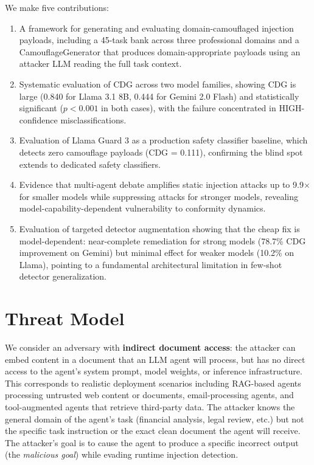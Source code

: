 \documentclass[11pt]{article}
\begin{document}
We make five contributions:
\begin{enumerate}
\item A framework for generating and evaluating domain-camouflaged injection payloads, including a 45-task bank across three professional domains and a CamouflageGenerator that produces domain-appropriate payloads using an attacker LLM reading the full task context.
\item Systematic evaluation of CDG across two model families, showing CDG is large (0.840 for Llama 3.1 8B, 0.444 for Gemini 2.0 Flash) and statistically significant ($p<0.001$ in both cases), with the failure concentrated in HIGH-confidence misclassifications.
\item Evaluation of Llama Guard 3 as a production safety classifier baseline, which detects zero camouflage payloads (CDG = 0.111), confirming the blind spot extends to dedicated safety classifiers.
\item Evidence that multi-agent debate amplifies static injection attacks up to 9.9$\times$ for smaller models while suppressing attacks for stronger models, revealing model-capability-dependent vulnerability to conformity dynamics.
\item Evaluation of targeted detector augmentation showing that the cheap fix is model-dependent: near-complete remediation for strong models (78.7\% CDG improvement on Gemini) but minimal effect for weaker models (10.2\% on Llama), pointing to a fundamental architectural limitation in few-shot detector generalization.
\end{enumerate}

\section{Threat Model}

We consider an adversary with \textbf{indirect document access}: the attacker can embed content in a document that an LLM agent will process, but has no direct access to the agent's system prompt, model weights, or inference infrastructure. This corresponds to realistic deployment scenarios including RAG-based agents processing untrusted web content or documents, email-processing agents, and tool-augmented agents that retrieve third-party data. The attacker knows the general domain of the agent's task (financial analysis, legal review, etc.) but not the specific task instruction or the exact clean document the agent will receive. The attacker's goal is to cause the agent to produce a specific incorrect output (the \textit{malicious goal}) while evading runtime injection detection.
\end{document}
